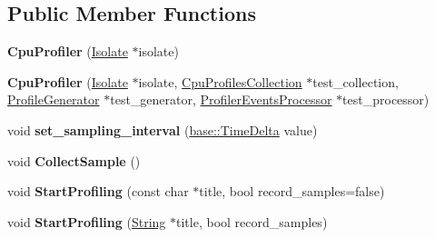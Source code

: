 \subsection*{Public Member Functions}
\begin{DoxyCompactItemize}
\item 
{\bfseries Cpu\+Profiler} (\hyperlink{classv8_1_1internal_1_1_isolate}{Isolate} $\ast$isolate)\hypertarget{classv8_1_1internal_1_1_cpu_profiler_a58e54bb45700330634856222e2f1dffd}{}\label{classv8_1_1internal_1_1_cpu_profiler_a58e54bb45700330634856222e2f1dffd}

\item 
{\bfseries Cpu\+Profiler} (\hyperlink{classv8_1_1internal_1_1_isolate}{Isolate} $\ast$isolate, \hyperlink{classv8_1_1internal_1_1_cpu_profiles_collection}{Cpu\+Profiles\+Collection} $\ast$test\+\_\+collection, \hyperlink{classv8_1_1internal_1_1_profile_generator}{Profile\+Generator} $\ast$test\+\_\+generator, \hyperlink{classv8_1_1internal_1_1_profiler_events_processor}{Profiler\+Events\+Processor} $\ast$test\+\_\+processor)\hypertarget{classv8_1_1internal_1_1_cpu_profiler_ae40aa7336ead1bb03ccd469b2fcc22ab}{}\label{classv8_1_1internal_1_1_cpu_profiler_ae40aa7336ead1bb03ccd469b2fcc22ab}

\item 
void {\bfseries set\+\_\+sampling\+\_\+interval} (\hyperlink{classv8_1_1base_1_1_time_delta}{base\+::\+Time\+Delta} value)\hypertarget{classv8_1_1internal_1_1_cpu_profiler_a967c226a0cbbcd9244269645ad3a1c0d}{}\label{classv8_1_1internal_1_1_cpu_profiler_a967c226a0cbbcd9244269645ad3a1c0d}

\item 
void {\bfseries Collect\+Sample} ()\hypertarget{classv8_1_1internal_1_1_cpu_profiler_a0ef016f320d592f5b72d1c56a70a6a2f}{}\label{classv8_1_1internal_1_1_cpu_profiler_a0ef016f320d592f5b72d1c56a70a6a2f}

\item 
void {\bfseries Start\+Profiling} (const char $\ast$title, bool record\+\_\+samples=false)\hypertarget{classv8_1_1internal_1_1_cpu_profiler_a07966800ae6687084824875b3083260f}{}\label{classv8_1_1internal_1_1_cpu_profiler_a07966800ae6687084824875b3083260f}

\item 
void {\bfseries Start\+Profiling} (\hyperlink{classv8_1_1internal_1_1_string}{String} $\ast$title, bool record\+\_\+samples)\hypertarget{classv8_1_1internal_1_1_cpu_profiler_ace77f1bf133803efcd8925e3891c5bec}{}\label{classv8_1_1internal_1_1_cpu_profiler_ace77f1bf133803efcd8925e3891c5bec}


\end{DoxyCompactItemize}

